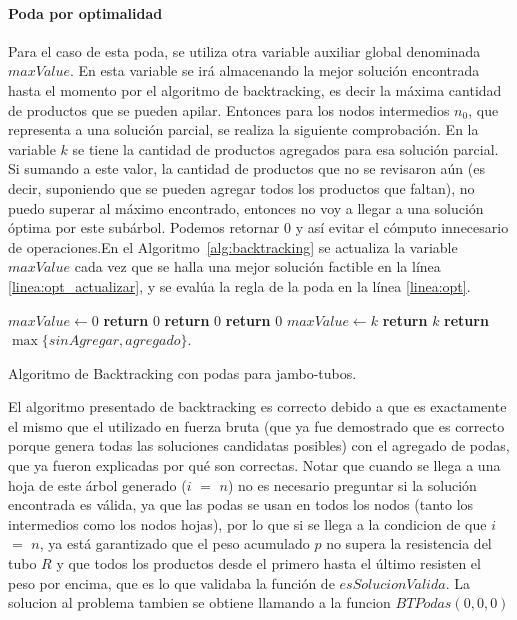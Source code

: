 \documentclass[10pt,a4paper]{article}
\begin{document}
\paragraph{Poda por optimalidad}
Para el caso de esta poda, se utiliza otra variable auxiliar global denominada $maxValue$. En esta variable se irá almacenando la mejor solución encontrada hasta el momento por el algoritmo de backtracking, es decir la máxima cantidad de productos que se pueden apilar. Entonces para los nodos intermedios $n_0$, que representa a una solución parcial, se realiza la siguiente comprobación. En la variable $k$ se tiene la cantidad de productos agregados para esa solución parcial. Si sumando a este valor, la cantidad de productos que no se revisaron aún (es decir, suponiendo que se pueden agregar todos los productos que faltan), no puedo superar al máximo encontrado, entonces no voy a llegar a una solución óptima por este subárbol. Podemos retornar 0 y así evitar el cómputo innecesario de operaciones.En el Algoritmo~\ref{alg:backtracking} se actualiza la variable $maxValue$ cada vez que se halla una mejor solución factible en la línea \ref{linea:opt_actualizar}, y se evalúa la regla de la poda en la línea \ref{linea:opt}.

\begin{algorithm}
\begin{algorithmic}[1]
\State $maxValue \gets 0$
   {\textbf{return} $0$}
   \EndIf
   {\textbf{return} $0$}
   \EndIf
   {\textbf{return} $0$}
   \EndIf
        {$maxValue \gets k$}
        \EndIf
        \State \textbf{return} $k$
    \EndIf
    \State \textbf{return} $\max \{ sinAgregar,agregado \}$.
\EndFunction
\end{algorithmic}
\caption{Algoritmo de Backtracking con podas para jambo-tubos.}
\label{alg:backtracking}
\end{algorithm}

El algoritmo presentado de backtracking es correcto debido a que es exactamente el mismo que el utilizado en fuerza bruta (que ya fue demostrado que es correcto porque genera todas las soluciones candidatas posibles) con el agregado de podas, que ya fueron explicadas por qué son correctas. Notar que cuando se llega a una hoja de este árbol generado ($i$ $=$ $n$) no es necesario preguntar si la solución encontrada es válida, ya que las podas se usan en todos los nodos (tanto los intermedios como los nodos hojas), por lo que si se llega a la condicion de que $i$ $=$ $n$, ya está garantizado que el peso acumulado $p$ no supera la resistencia del tubo $R$ y que todos los productos desde el primero hasta el último resisten el peso por encima, que es lo que validaba la función de $esSolucionValida$. La solucion al problema tambien se obtiene llamando a la funcion $BTPodas(0, 0 , 0)$
\end{document}
